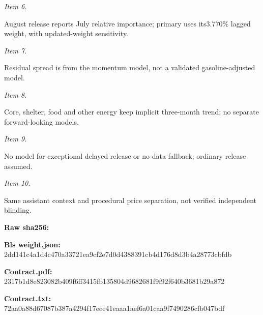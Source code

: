 \documentclass[11pt]{article}
\begin{document}
\par\noindent\textit{Item 6.}\par August release reports July relative importance; primary uses its3.770\% lagged weight, with updated-weight sensitivity.

\par\noindent\textit{Item 7.}\par Residual spread is from the momentum model, not a validated gasoline-adjusted model.

\par\noindent\textit{Item 8.}\par Core, shelter, food and other energy keep implicit three-month trend; no separate forward-looking models.

\par\noindent\textit{Item 9.}\par No model for exceptional delayed-release or no-data fallback; ordinary release assumed.

\par\noindent\textit{Item 10.}\par Same assistant context and procedural price separation, not verified independent blinding.

\par\noindent\textbf{Raw sha256:} \par \par\noindent\textbf{Bls weight.json:} 2dd141c4a1d4\hspace{0pt}c470a33721ea\hspace{0pt}9cf2e7d0d438\hspace{0pt}8391cb4d176d\hspace{0pt}8d3b4a28773c\hspace{0pt}bfdb

\par\noindent\textbf{Contract.pdf:} 2317b1d8e823\hspace{0pt}082b409f6ff3\hspace{0pt}415fb135804d\hspace{0pt}9682681f9f92\hspace{0pt}f640b3681b29\hspace{0pt}a872

\par\noindent\textbf{Contract.txt:} 72aa0a88d670\hspace{0pt}87b387a4294f\hspace{0pt}17eee41eaaa1\hspace{0pt}aef6a01caa9f\hspace{0pt}7490286cfb04\hspace{0pt}7bdf
\end{document}

